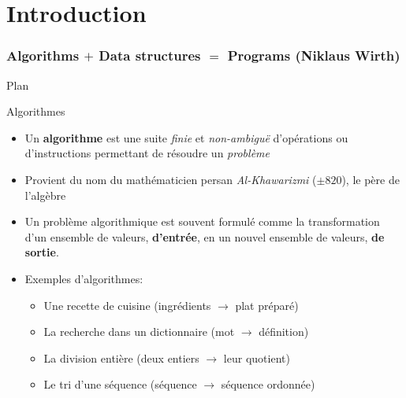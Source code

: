 
\part{Introduction}

\section{Algorithms $+$ Data structures $=$ Programs (\footnotesize{Niklaus Wirth})}

\begin{frame}{Plan}

\tableofcontents

\end{frame}

\begin{frame}{Algorithmes}

\begin{itemize}
\item Un {\bf algorithme} est une suite {\em finie} et {\em non-ambiguë} d'opérations ou d'instructions permettant de résoudre un {\em problème}
\item Provient du nom du mathématicien persan {\em Al-Khawarizmi}
  ($\pm 820$), le père de l'algèbre
\item Un problème algorithmique est souvent formulé comme la
  transformation d'un ensemble de valeurs, {\bf d'entrée}, en un
  nouvel ensemble de valeurs, {\bf de sortie}.
\item Exemples d'algorithmes:
\begin{itemize}
\item Une recette de cuisine (ingrédients $\rightarrow$ plat préparé)
\item La recherche dans un dictionnaire (mot $\rightarrow$ définition)
\item La division entière (deux entiers $\rightarrow$ leur quotient)
\item Le tri d'une séquence (séquence $\rightarrow$ séquence ordonnée)

\end{itemize}
\end{itemize}

\end{frame}

